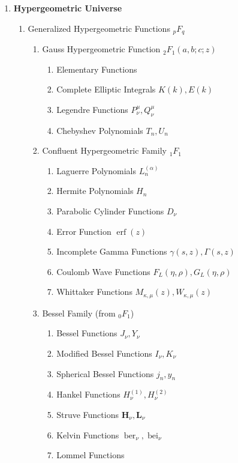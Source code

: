 \begin{enumerate}[label=\textbf{\arabic*.}]
	\item \textbf{Hypergeometric Universe}
	\begin{enumerate}[label=\textbf{\alph*)}]
		\item Generalized Hypergeometric Functions ${}_pF_q$
		\begin{enumerate}[label=\textbf{\roman*)}]
			\item Gauss Hypergeometric Function ${}_2F_1(a,b;c;z)$
			\begin{enumerate}[label=\textbf{\arabic*)}]
				\item Elementary Functions
				\item Complete Elliptic Integrals $K(k), E(k)$
				\item Legendre Functions $P_\nu^\mu, Q_\nu^\mu$
				\item Chebyshev Polynomials $T_n, U_n$
			\end{enumerate}
			\item Confluent Hypergeometric Family ${}_1F_1$
			\begin{enumerate}[label=\textbf{\arabic*)}]
				\item Laguerre Polynomials $L_n^{(\alpha)}$
				\item Hermite Polynomials $H_n$
				\item Parabolic Cylinder Functions $D_\nu$
				\item Error Function $\operatorname{erf}(z)$
				\item Incomplete Gamma Functions $\gamma(s,z), \Gamma(s,z)$
				\item Coulomb Wave Functions $F_L(\eta,\rho), G_L(\eta,\rho)$
				\item Whittaker Functions $M_{\kappa,\mu}(z), W_{\kappa,\mu}(z)$
			\end{enumerate}
			\item Bessel Family (from ${}_0F_1$)
			\begin{enumerate}[label=\textbf{\arabic*)}]
				\item Bessel Functions $J_\nu, Y_\nu$
				\item Modified Bessel Functions $I_\nu, K_\nu$
				\item Spherical Bessel Functions $j_n, y_n$
				\item Hankel Functions $H_\nu^{(1)}, H_\nu^{(2)}$
				\item Struve Functions $\mathbf{H}_\nu, \mathbf{L}_\nu$
				\item Kelvin Functions $\operatorname{ber}_\nu, \operatorname{bei}_\nu$
				\item Lommel Functions

\end{enumerate}
\end{enumerate}
\end{enumerate}
\end{enumerate}
